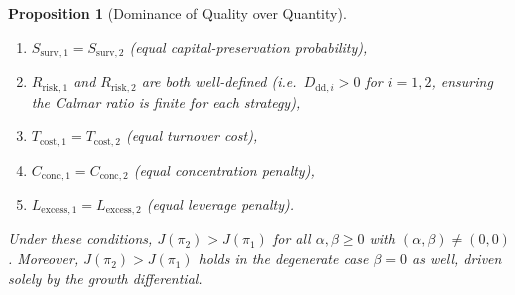 \documentclass[12pt,openany]{book}
\numberwithin{equation}{chapter}
\theoremstyle{plain}
\newtheorem{proposition}[theorem]{Proposition}
\theoremstyle{definition}
\theoremstyle{remark}
\numberwithin{equation}{chapter}
\theoremstyle{plain}
\begin{document}
\begin{proposition}[Dominance of Quality over Quantity]
\begin{enumerate}
  \item $S_{\mathrm{surv},1} = S_{\mathrm{surv},2}$
        (equal capital-preservation probability),
  \item $R_{\mathrm{risk},1}$ and $R_{\mathrm{risk},2}$ are both
        well-defined (i.e.\ $D_{\mathrm{dd},i} > 0$ for $i=1,2$,
        ensuring the Calmar ratio is finite for each strategy),
  \item $T_{\mathrm{cost},1} = T_{\mathrm{cost},2}$ (equal turnover cost),
  \item $C_{\mathrm{conc},1} = C_{\mathrm{conc},2}$
        (equal concentration penalty),
  \item $L_{\mathrm{excess},1} = L_{\mathrm{excess},2}$
        (equal leverage penalty).
\end{enumerate}
Under these conditions, $J(\pi_2) > J(\pi_1)$ for all
$\alpha, \beta \geq 0$ with $(\alpha, \beta) \neq (0,0)$.
Moreover, $J(\pi_2) > J(\pi_1)$ holds in the degenerate case
$\beta = 0$ as well, driven solely by the growth differential.
\end{proposition}
\end{document}
